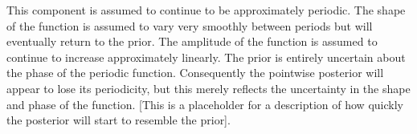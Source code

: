 This component is assumed to continue to be approximately periodic.
The shape of the function is assumed to vary very smoothly between periods but will eventually return to the prior.
The amplitude of the function is assumed to continue to increase approximately linearly.
The prior is entirely uncertain about the phase of the periodic function.
Consequently the pointwise posterior will appear to lose its periodicity, but this merely reflects the uncertainty in the shape and phase of the function.
[This is a placeholder for a description of how quickly the posterior will start to resemble the prior].